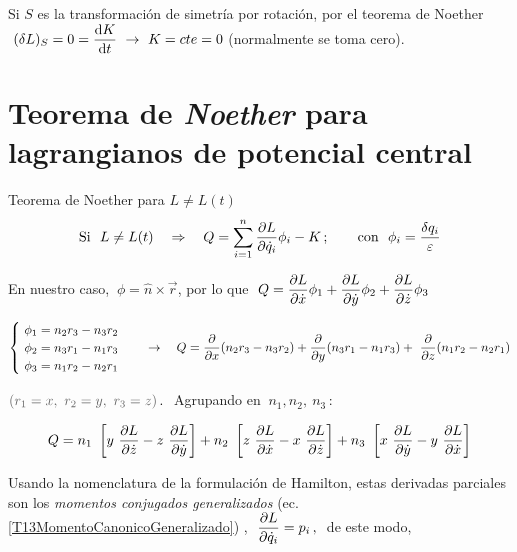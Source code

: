 Si $S$ es la transformación de simetría por rotación, por el teorema de Noether $\ (\var L)_S=0=\displaystyle \dv{K}{t} \ \to \ K=cte=0$ (normalmente se toma cero).



\vspace{10mm}
\section{Teorema de \emph{Noether} para lagrangianos de potencial central}
\vspace{5mm}

\begin{large}
\begin{myblock}{Teorema de Noether para $L\neq L(t)$}
\begin{equation}
\text{Si } \ L\neq L(t) \quad \Rightarrow \quad Q=\sum_{i=1}^n \pdv{L}{\dot q_i} \phi_i-K \, ; \qquad \text{con } \ \phi_i=\dfrac{\var q_i}{\varepsilon}	
\end{equation}	
\end{myblock}
\end{large}

En nuestro caso, $\ \phi=\hat n \times \vec r$, por lo que $\ Q=\displaystyle \pdv{L}{\dot x} \phi_1+\pdv{L}{\dot y} \phi_2+\pdv{L}{\dot z} \phi_3$

$\begin{cases}
\ \phi_1=n_2r_3-n_3r_2 \\ \ \phi_2=n_3r_1-n_1r_3 \\ \ \phi_3=n_1r_2-n_2r_1	
\end{cases} \quad \to  \quad Q=
 \displaystyle \pdv{x} ( n_2r_3-n_3r_2 )  + \displaystyle \pdv{y} ( n_3r_1-n_1r_3) +  \ \displaystyle \pdv{z} (n_1r_2-n_2r_1	) $ 	

$\textcolor{gris}{(r_1=x,\ r_2=y,\ r_3=z) }\, . \ $ Agrupando en $\ n_1, n_2,\ n_3\, : $

\begin{equation}
\label{T16Qcomponentes}
Q=\displaystyle n_1\ \left[ y \  \pdv{L}{\dot z} - z \ \pdv{L}{\dot y} \right] +  
n_2\ \left[ z \  \pdv{L}{\dot x} - x \ \pdv{L}{\dot z} \right]  + n_3\ \left[ x \  \pdv{L}{\dot y} - y \ \pdv{L}{\dot x} \right] 
\end{equation}


Usando la nomenclatura de la formulación de Hamilton, estas derivadas parciales son los \emph{momentos conjugados generalizados} (ec. \ref{T13MomentoCanonicoGeneralizado}) , $\ \displaystyle \pdv{L}{\dot q_i}=p_i\, , \ $ de este modo,


